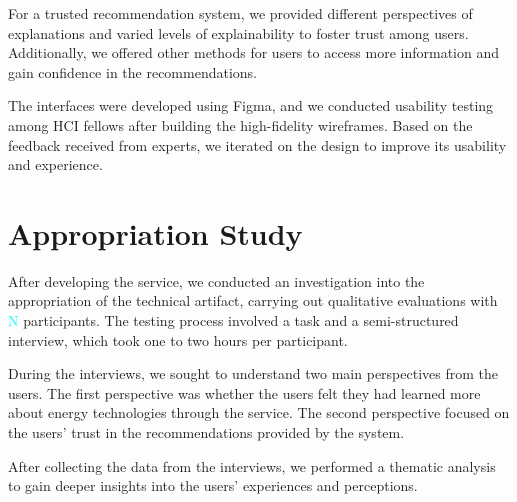 For a trusted recommendation system, we provided different perspectives of explanations and varied levels of explainability to foster trust among users.
Additionally, we offered other methods for users to access more information and gain confidence in the recommendations.

The interfaces were developed using Figma, and we conducted usability testing among HCI fellows after building the high-fidelity wireframes. 
Based on the feedback received from experts, we iterated on the design to improve its usability and experience.


\section{Appropriation Study}

After developing the service, 
we conducted an investigation into the appropriation of the technical artifact, carrying out qualitative evaluations with \textcolor{cyan}{N} participants. 
The testing process involved a task and a semi-structured interview, which took one to two hours per participant.

During the interviews, we sought to understand two main perspectives from the users. 
The first perspective was whether the users felt they had learned more about energy technologies through the service. 
The second perspective focused on the users' trust in the recommendations provided by the system.

After collecting the data from the interviews, we performed a thematic analysis to gain deeper insights into the users' experiences and perceptions. 


